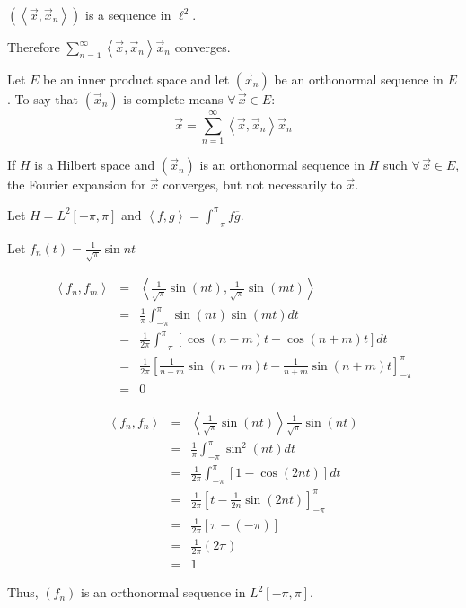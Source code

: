 \documentclass[letterpaper,12pt,fleqn]{article}
\newcommand{\vx}{\vec{x}}
\newcommand{\inner}[1]{\left<#1\right>}
\newcommand{\conj}[1]{\overline{#1}}
\begin{document}
\newpage

\begin{theproof}
  $(\inner{\vx,\vx_n})$ is a sequence in $\ell^2$.

  Therefore $\sum_{n=1}^{\infty}\inner{\vx,\vx_n}\vx_n$ converges.
\end{theproof}

\begin{definition}[Complete]
  Let $E$ be an inner product space and let $(\vx_n)$ be an orthonormal
  sequence in $E$. To say that $(\vx_n)$ is complete means $\forall\,\vx\in E$:
  \[\vx=\sum_{n=1}^{\infty}\inner{\vx,\vx_n}\vx_n\]
\end{definition}

If $H$ is a Hilbert space and $(\vx_n)$ is an orthonormal sequence in $H$ such
$\forall\,\vx\in E$, the Fourier expansion for $\vx$ converges, but not
necessarily to $\vx$.

Let $H=L^2[-\pi,\pi]$ and $\inner{f,g}=\int_{-\pi}^{\pi}f\conj{g}$.

Let $f_n(t)=\frac{1}{\sqrt{\pi}}\sin{nt}$

\begin{eqnarray*}
  \inner{f_n,f_m} &=&
  \inner{\frac{1}{\sqrt{\pi}}\sin(nt),\frac{1}{\sqrt{\pi}}\sin(mt)} \\
  &=& \frac{1}{\pi}\int_{-\pi}^{\pi}\sin(nt)\sin(mt)dt \\
  &=& \frac{1}{2\pi}\int_{-\pi}^{\pi}[\cos(n-m)t-\cos(n+m)t]dt \\
  &=& \frac{1}{2\pi}\left[\frac{1}{n-m}\sin(n-m)t-\frac{1}{n+m}\sin(n+m)t
    \right]_{-\pi}^{\pi} \\
  &=& 0
\end{eqnarray*}

\begin{eqnarray*}
  \inner{f_n,f_n} &=&
  \inner{\frac{1}{\sqrt{\pi}}\sin(nt)}{\frac{1}{\sqrt{\pi}}\sin(nt)} \\
  &=& \frac{1}{\pi}\int_{-\pi}^{\pi}\sin^2(nt)dt \\
  &=& \frac{1}{2\pi}\int_{-\pi}^{\pi}[1-\cos(2nt)]dt \\
  &=& \frac{1}{2\pi}\left[t-\frac{1}{2n}\sin(2nt)\right]_{-\pi}^{\pi} \\
  &=& \frac{1}{2\pi}[\pi-(-\pi)] \\
  &=& \frac{1}{2\pi}(2\pi) \\
  &=& 1
\end{eqnarray*}

Thus, $(f_n)$ is an orthonormal sequence in $L^2[-\pi,\pi]$.
\end{document}
